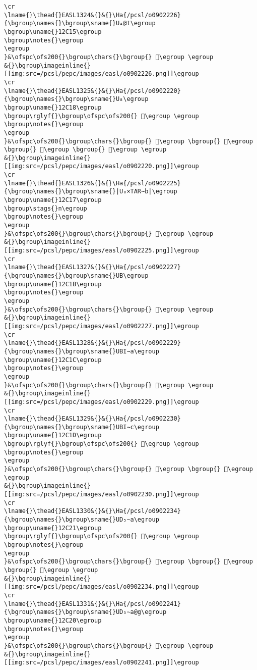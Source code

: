 \begin{verbatim}
\cr
\lname{}\thead{}EASL1324&{}&{}\Ha{/pcsl/o0902226}{\bgroup\names{}\bgroup\sname{}U₄@t\egroup
\bgroup\uname{}12C15\egroup
\bgroup\notes{}\egroup
\egroup
}&\ofspc\ofs200{}\bgroup\chars{}\bgroup{} 𒰕\egroup \egroup
&{}\bgroup\imageinline{}[[img:src=/pcsl/pepc/images/easl/o0902226.png]]\egroup
\cr
\lname{}\thead{}EASL1325&{}&{}\Ha{/pcsl/o0902220}{\bgroup\names{}\bgroup\sname{}U₈\egroup
\bgroup\uname{}12C18\egroup
\bgroup\rglyf{}\bgroup\ofspc\ofs200{} 𒰘\egroup \egroup
\bgroup\notes{}\egroup
\egroup
}&\ofspc\ofs200{}\bgroup\chars{}\bgroup{} 𒰖\egroup \bgroup{} 𒰘\egroup \bgroup{} 𒰙\egroup \bgroup{} 𒰚\egroup \egroup
&{}\bgroup\imageinline{}[[img:src=/pcsl/pepc/images/easl/o0902220.png]]\egroup
\cr
\lname{}\thead{}EASL1326&{}&{}\Ha{/pcsl/o0902225}{\bgroup\names{}\bgroup\sname{}|U₈×TAR∼b|\egroup
\bgroup\uname{}12C17\egroup
\bgroup\stags{}n\egroup
\bgroup\notes{}\egroup
\egroup
}&\ofspc\ofs200{}\bgroup\chars{}\bgroup{} 𒰗\egroup \egroup
&{}\bgroup\imageinline{}[[img:src=/pcsl/pepc/images/easl/o0902225.png]]\egroup
\cr
\lname{}\thead{}EASL1327&{}&{}\Ha{/pcsl/o0902227}{\bgroup\names{}\bgroup\sname{}UB\egroup
\bgroup\uname{}12C1B\egroup
\bgroup\notes{}\egroup
\egroup
}&\ofspc\ofs200{}\bgroup\chars{}\bgroup{} 𒰛\egroup \egroup
&{}\bgroup\imageinline{}[[img:src=/pcsl/pepc/images/easl/o0902227.png]]\egroup
\cr
\lname{}\thead{}EASL1328&{}&{}\Ha{/pcsl/o0902229}{\bgroup\names{}\bgroup\sname{}UBI∼a\egroup
\bgroup\uname{}12C1C\egroup
\bgroup\notes{}\egroup
\egroup
}&\ofspc\ofs200{}\bgroup\chars{}\bgroup{} 𒰜\egroup \egroup
&{}\bgroup\imageinline{}[[img:src=/pcsl/pepc/images/easl/o0902229.png]]\egroup
\cr
\lname{}\thead{}EASL1329&{}&{}\Ha{/pcsl/o0902230}{\bgroup\names{}\bgroup\sname{}UBI∼c\egroup
\bgroup\uname{}12C1D\egroup
\bgroup\rglyf{}\bgroup\ofspc\ofs200{} 𒰝\egroup \egroup
\bgroup\notes{}\egroup
\egroup
}&\ofspc\ofs200{}\bgroup\chars{}\bgroup{} 𒰝\egroup \bgroup{} 𒰞\egroup \egroup
&{}\bgroup\imageinline{}[[img:src=/pcsl/pepc/images/easl/o0902230.png]]\egroup
\cr
\lname{}\thead{}EASL1330&{}&{}\Ha{/pcsl/o0902234}{\bgroup\names{}\bgroup\sname{}UD₅∼a\egroup
\bgroup\uname{}12C21\egroup
\bgroup\rglyf{}\bgroup\ofspc\ofs200{} 𒰡\egroup \egroup
\bgroup\notes{}\egroup
\egroup
}&\ofspc\ofs200{}\bgroup\chars{}\bgroup{} 𒰟\egroup \bgroup{} 𒰡\egroup \bgroup{} 𒰢\egroup \egroup
&{}\bgroup\imageinline{}[[img:src=/pcsl/pepc/images/easl/o0902234.png]]\egroup
\cr
\lname{}\thead{}EASL1331&{}&{}\Ha{/pcsl/o0902241}{\bgroup\names{}\bgroup\sname{}UD₅∼a@g\egroup
\bgroup\uname{}12C20\egroup
\bgroup\notes{}\egroup
\egroup
}&\ofspc\ofs200{}\bgroup\chars{}\bgroup{} 𒰠\egroup \egroup
&{}\bgroup\imageinline{}[[img:src=/pcsl/pepc/images/easl/o0902241.png]]\egroup

\end{verbatim}
